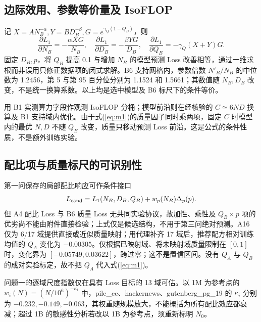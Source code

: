 \subsection{边际效用、参数等价量及 IsoFLOP}
记 $X=A N_B^{-\alpha},Y=B D_B^{-\beta},G=e^{\gamma_Q(1-Q_B)}$，则
\begin{equation}
\frac{\partial L_1}{\partial N_B}=-\frac{\alpha XG}{N_B},\quad
\frac{\partial L_1}{\partial D_B}=-\frac{\beta YG}{D_B},\quad
\frac{\partial L_1}{\partial Q_B}=-\gamma_Q(X+Y)G .
\end{equation}
固定 $D_B,p$，将 $Q_B$ 提高 0.1 与增加 $N_B$ 的模型预测 Loss 改善相等，通过一维求根而非误用只修正数据项的闭式求解。B6 支持网格内，参数倍数 $N'_B/N_B$ 的中位数为 1.2456，第 5 与第 95 百分位分别为 1.1524 和 1.5661；其数值随 $N_B,D_B$ 改变，不是统一换算系数。以上均是选中模型及 B6 标尺下的条件等价。

用 B1 实测算力字段作观测 IsoFLOP 分桶；模型前沿则在经核验的 $C\simeq6ND$ 换算及 B1 支持域内优化。由于式(\ref{eq:m1})的质量因子同时乘两项，固定 $C$ 时模型内的最优 $N,D$ 不随 $Q_B$ 改变，质量只移动预测 Loss 前沿。这是公式的条件性质，不是额外训练实验。

\subsection{配比项与质量标尺的可识别性}
第一问保存的局部配比响应可作条件接口
\begin{equation}
L_{\rm cand}=L_1(N_B,D_B,Q_B)+w_p(N_B)\Delta_p(p).
\end{equation}
但 A4 配比 Loss 与 B6 质量 Loss 无共同实验协议，故加性、乘性及 $Q_B\times p$ 项的优劣尚不能由附件直接检验；上式仅是候选结构，不用于第三问绝对预测。A16 仅为 6/17 域提供直接或近似质量映射；用代理补齐 17 域后，推荐配方相对训练均值的 $Q_A$ 变化为 $-0.00305$。仅根据已映射域、将未映射域质量限制在 $[0,1]$ 时，变化界为 $[-0.05749,0.03622]$，跨过零；这不是置信区间。没有 $Q_A$ 与 $Q_B$ 的成对实验标定，故不把 $Q_A$ 代入式(\ref{eq:m1})。


问题一的逐域尺度指数仅在具有 Loss 目标的 13 域可估。以 1M 为参考点的 $w_i(N)=(N/10^6)^{-\kappa_i}$ 中，pile\_cc、hackernews、gutenberg\_pg\_19 的 $\kappa_i$ 分别为 $-0.232,-0.149,-0.063$，其权重随规模放大，不能概括为所有配比效应都衰减；超过 1B 的敏感性分析若改以 1B 为参考点，须重新标明 $N_0$。
